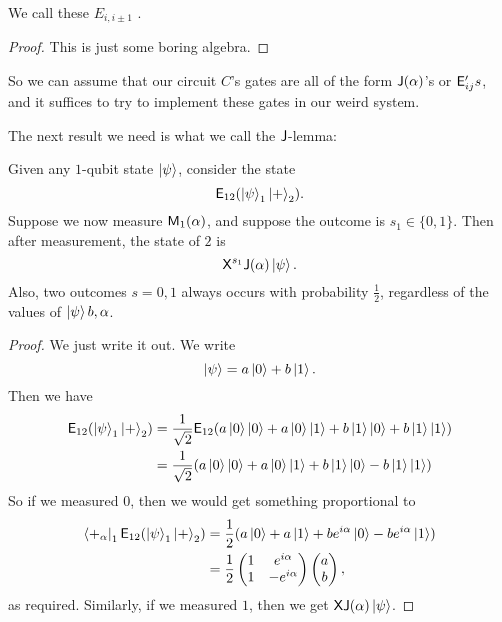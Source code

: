 We call these $E_{i, i \pm 1}$ .
\begin{proof}
  This is just some boring algebra.
\end{proof}

So we can assume that our circuit $C$'s gates are all of the form $\mathsf{J}(\alpha)$'s or $\mathsf{E}_{ij}'s$, and it suffices to try to implement these gates in our weird system.

The next result we need is what we call the $\qJ$-lemma:
\begin{lemma}[$\qJ$-lemma]
  Given any $1$-qubit state $\left\lvert \psi\right\rangle$, consider the state
  \[
    \mathsf{E}_{12} (\left\lvert \psi\right\rangle_1 \left\lvert +\right\rangle_2).
  \]
  Suppose we now measure $\mathsf{M}_1(\alpha)$, and suppose the outcome is $s_1 \in \{0, 1\}$. Then after measurement, the state of $2$ is
  \[
    \mathsf{X}^{s_1} \mathsf{J}(\alpha) \left\lvert \psi\right\rangle.
  \]
  Also, two outcomes $s = 0, 1$ always occurs with probability $\frac{1}{2}$, regardless of the values of $\left\lvert \psi\right\rangle b, \alpha$.
\end{lemma}

\begin{proof}
  We just write it out. We write
  \[
    \left\lvert \psi\right\rangle = a \left\lvert 0\right\rangle + b \left\lvert 1\right\rangle.
  \]
  Then we have
  \begin{align*}
    \mathsf{E}_{12} (\left\lvert \psi\right\rangle_1 \left\lvert +\right\rangle_2) &= \frac{1}{\sqrt{2}} \mathsf{E}_{12}(a \left\lvert 0\right\rangle\left\lvert 0\right\rangle + a \left\lvert 0\right\rangle\left\lvert 1\right\rangle + b \left\lvert 1\right\rangle\left\lvert 0\right\rangle + b \left\lvert 1\right\rangle\left\lvert 1\right\rangle)\\
    &= \frac{1}{\sqrt{2}}(a \left\lvert 0\right\rangle\left\lvert 0\right\rangle + a \left\lvert 0\right\rangle\left\lvert 1\right\rangle + b \left\lvert 1\right\rangle\left\lvert 0\right\rangle - b \left\lvert 1\right\rangle\left\lvert 1\right\rangle)
  \end{align*}
  So if we measured $0$, then we would get something proportional to
  \begin{align*}
    \left\langle +_\alpha \right\rvert_1\mathsf{E}_{12} (\left\lvert \psi\right\rangle_1 \left\lvert +\right\rangle_2) &= \frac{1}{2}(a \left\lvert 0\right\rangle + a \left\lvert 1\right\rangle + b e^{i\alpha} \left\lvert 0\right\rangle - be^{i\alpha} \left\lvert 1\right\rangle)\\
    &= \frac{1}{2}
    \begin{pmatrix}
      1 & e^{i\alpha}\\
      1 & -e^{i\alpha}
    \end{pmatrix}
    \begin{pmatrix}
      a\\b
    \end{pmatrix},
  \end{align*}
  as required. Similarly, if we measured $1$, then we get $\mathsf{X} \mathsf{J}(\alpha) \left\lvert \psi\right\rangle$.
\end{proof}

